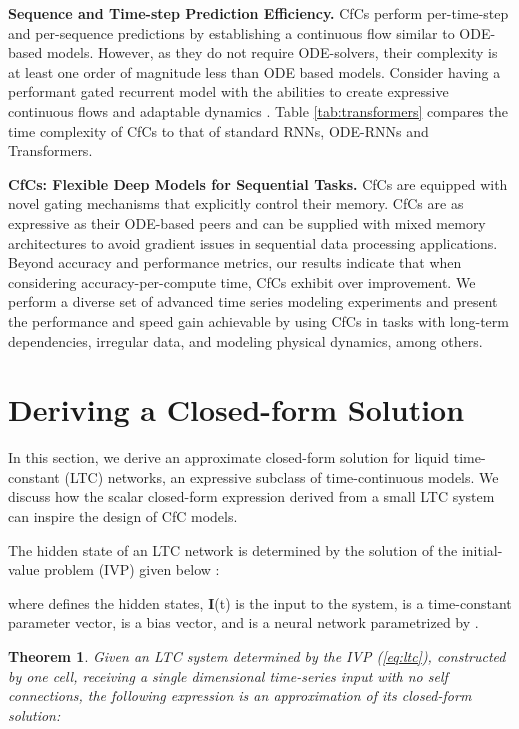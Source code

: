 \documentclass[12pt]{article}
\newtheorem{theorem}{Theorem}
\begin{document}
\noindent \textbf{Sequence and Time-step Prediction Efficiency.} CfCs perform per-time-step and per-sequence predictions by establishing a continuous flow similar to ODE-based models. However, as they do not require ODE-solvers, their complexity is at least one order of magnitude less than ODE based models. Consider  having a performant gated recurrent model \cite{hochreiter1997long} with the abilities to create expressive continuous flows \cite{chen2018neural} and adaptable dynamics \cite{hasani2021liquid}. Table \ref{tab:transformers} compares the time complexity of CfCs to that of standard RNNs, ODE-RNNs and Transformers. 

\noindent \textbf{CfCs: Flexible Deep Models for Sequential Tasks.} CfCs are equipped with novel gating mechanisms that explicitly control their memory. CfCs are as expressive as their ODE-based peers and can be supplied with mixed memory architectures \cite{lechner2020learning} to avoid gradient issues in sequential data processing applications. Beyond accuracy and performance metrics, our results indicate that when considering accuracy-per-compute time, CfCs exhibit over  improvement. We perform a diverse set of advanced time series modeling experiments and present the performance and speed gain achievable by using CfCs in tasks with long-term dependencies, irregular data, and modeling physical dynamics, among others. 

\section*{Deriving a Closed-form Solution}
\label{sec:deriving}

In this section, we derive an approximate closed-form solution for liquid time-constant (LTC) networks, an expressive subclass of time-continuous models. We discuss how the scalar closed-form expression derived from a small LTC system can inspire the design of CfC models.

The hidden state of an LTC network is determined by the solution of the initial-value problem (IVP) given below \cite{hasani2021liquid}:

where  defines the hidden states, \textbf{I}(t) is the input to the system,  is a time-constant parameter vector,  is a bias vector, and  is a neural network parametrized by .

\begin{theorem}
\label{theo:ltc_closed_form}
Given an LTC system determined by the IVP (\ref{eq:ltc}), constructed by one cell, receiving a single dimensional time-series input  with no self connections, the following expression is an approximation of its closed-form solution: 
\end{theorem}
\end{document}
